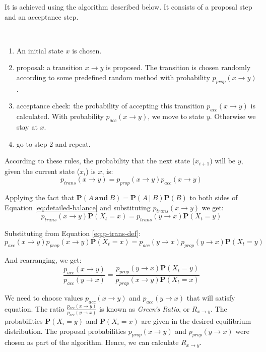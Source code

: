 \noindent It is achieved using the algorithm described below.  It
consists of a proposal step and an acceptance step.

\begin{algorithm}
\ 

\begin{enumerate}
\item An initial state $x$ is chosen.
\item proposal: a transition $x \to y$ is proposed.  The transition is
chosen randomly according to some predefined random method with
probability $p_{prop}(x \to y)$.
\item acceptance check: the probability of accepting this transition
$p_{acc}(x \to y)$ is calculated.  With probability $p_{acc}(x \to
y)$, we move to state $y$.  Otherwise we stay at $x$.
\item go to step 2 and repeat.
\end{enumerate}

According to these rules, the probability that the next state
($x_{i+1}$) will be $y$, given the current state ($x_i$) is $x$, is:
\begin{equation}\label{eq:p-trans-def}
p_{trans}(x \to y) = p_{prop}(x \to y) p_{acc}(x \to y)
\end{equation}
\end{algorithm}

\noindent Applying the fact that $\mathbf{P}(A\ \mathbf{and}\ B) =
\mathbf{P}(A\ |\ B) \mathbf{P}(B)$ to both sides of Equation
\ref{eq:detailed-balance} and substituting $p_{trans}(x \to y)$ we
get:
\begin{equation}
p_{trans}(x \to y) \mathbf{P}(X_t = x) =
   p_{trans}(y \to x) \mathbf{P}(X_t = y)
\end{equation}

\noindent Substituting from Equation \ref{eq:p-trans-def}:
\begin{equation}
p_{acc}(x \to y) p_{prop}(x \to y) \mathbf{P}(X_t = x) =
   p_{acc}(y \to x) p_{prop}(y \to x) \mathbf{P}(X_t = y)
\end{equation}

\noindent And rearranging, we get:
\begin{equation}
\frac{p_{acc}(x \to y)}{p_{acc}(y \to x)} =
  \frac{p_{prop}(y \to x) \mathbf{P}(X_t = y)}{
        p_{prop}(x \to y) \mathbf{P}(X_t = x)}
\end{equation}

\noindent We need to choose values $p_{acc}(x \to y)$ and $p_{acc}(y
\to x)$ that will satisfy equation.  The ratio $\frac{p_{acc}(x \to
y)}{p_{acc}(y \to x)}$ is known as \emph{Green's Ratio}, or $R_{x \to
y}$.  The probabilities $\mathbf{P}(X_i = y)$ and $\mathbf{P}(X_i =
x)$ are given in the desired equilibrium distribution.  The proposal
probabilities $p_{prop}(x \to y)$ and $p_{prop}(y \to x)$ were chosen
as part of the algorithm.  Hence, we can calculate $R_{x \to y}$.


